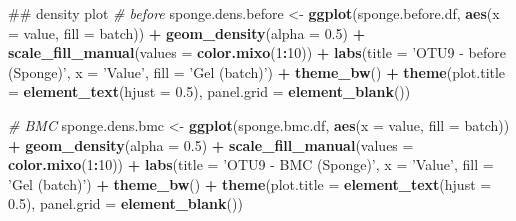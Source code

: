 \documentclass[]{book}
\newenvironment{Shaded}{\begin{snugshade}}{\end{snugshade}}
\newcommand{\KeywordTok}[1]{\textcolor[rgb]{0.13,0.29,0.53}{\textbf{#1}}}
\newcommand{\DataTypeTok}[1]{\textcolor[rgb]{0.13,0.29,0.53}{#1}}
\newcommand{\DecValTok}[1]{\textcolor[rgb]{0.00,0.00,0.81}{#1}}
\newcommand{\FloatTok}[1]{\textcolor[rgb]{0.00,0.00,0.81}{#1}}
\newcommand{\StringTok}[1]{\textcolor[rgb]{0.31,0.60,0.02}{#1}}
\newcommand{\CommentTok}[1]{\textcolor[rgb]{0.56,0.35,0.01}{\textit{#1}}}
\newcommand{\OperatorTok}[1]{\textcolor[rgb]{0.81,0.36,0.00}{\textbf{#1}}}
\newcommand{\NormalTok}[1]{#1}
\begin{document}
\begin{Shaded}
\begin{Highlighting}[]
\NormalTok{## density plot}
\CommentTok{# before}
\NormalTok{sponge.dens.before <-}\StringTok{ }\KeywordTok{ggplot}\NormalTok{(sponge.before.df, }\KeywordTok{aes}\NormalTok{(}\DataTypeTok{x =}\NormalTok{ value, }\DataTypeTok{fill =}\NormalTok{ batch)) }\OperatorTok{+}\StringTok{ }
\StringTok{  }\KeywordTok{geom_density}\NormalTok{(}\DataTypeTok{alpha =} \FloatTok{0.5}\NormalTok{) }\OperatorTok{+}\StringTok{ }\KeywordTok{scale_fill_manual}\NormalTok{(}\DataTypeTok{values =} \KeywordTok{color.mixo}\NormalTok{(}\DecValTok{1}\OperatorTok{:}\DecValTok{10}\NormalTok{)) }\OperatorTok{+}\StringTok{ }
\StringTok{  }\KeywordTok{labs}\NormalTok{(}\DataTypeTok{title =} \StringTok{'OTU9 - before (Sponge)'}\NormalTok{, }\DataTypeTok{x =} \StringTok{'Value'}\NormalTok{, }\DataTypeTok{fill =} \StringTok{'Gel (batch)'}\NormalTok{) }\OperatorTok{+}\StringTok{ }
\StringTok{  }\KeywordTok{theme_bw}\NormalTok{() }\OperatorTok{+}\StringTok{ }\KeywordTok{theme}\NormalTok{(}\DataTypeTok{plot.title =} \KeywordTok{element_text}\NormalTok{(}\DataTypeTok{hjust =} \FloatTok{0.5}\NormalTok{), }
                     \DataTypeTok{panel.grid =} \KeywordTok{element_blank}\NormalTok{())}

\CommentTok{# BMC}
\NormalTok{sponge.dens.bmc <-}\StringTok{ }\KeywordTok{ggplot}\NormalTok{(sponge.bmc.df, }\KeywordTok{aes}\NormalTok{(}\DataTypeTok{x =}\NormalTok{ value, }\DataTypeTok{fill =}\NormalTok{ batch)) }\OperatorTok{+}\StringTok{ }
\StringTok{  }\KeywordTok{geom_density}\NormalTok{(}\DataTypeTok{alpha =} \FloatTok{0.5}\NormalTok{) }\OperatorTok{+}\StringTok{ }\KeywordTok{scale_fill_manual}\NormalTok{(}\DataTypeTok{values =} \KeywordTok{color.mixo}\NormalTok{(}\DecValTok{1}\OperatorTok{:}\DecValTok{10}\NormalTok{)) }\OperatorTok{+}\StringTok{ }
\StringTok{  }\KeywordTok{labs}\NormalTok{(}\DataTypeTok{title =} \StringTok{'OTU9 - BMC (Sponge)'}\NormalTok{, }\DataTypeTok{x =} \StringTok{'Value'}\NormalTok{, }\DataTypeTok{fill =} \StringTok{'Gel (batch)'}\NormalTok{) }\OperatorTok{+}\StringTok{ }
\StringTok{  }\KeywordTok{theme_bw}\NormalTok{() }\OperatorTok{+}\StringTok{ }\KeywordTok{theme}\NormalTok{(}\DataTypeTok{plot.title =} \KeywordTok{element_text}\NormalTok{(}\DataTypeTok{hjust =} \FloatTok{0.5}\NormalTok{), }
                     \DataTypeTok{panel.grid =} \KeywordTok{element_blank}\NormalTok{())}



\end{Highlighting}
\end{Shaded}
\end{document}
